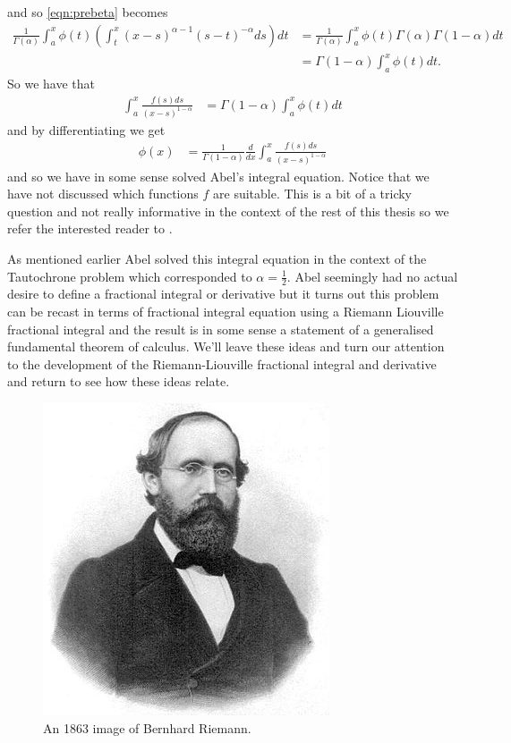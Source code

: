 and so \eqref{eqn:prebeta} becomes
\begin{align}
	\frac{1}{\Gamma(\alpha)} \int_a^x \phi(t) \left( \int_t^x (x-s)^{\alpha-1}(s-t)^{-\alpha} ds\right) dt
		&= \frac{1}{\Gamma(\alpha)} \int_a^x \phi(t) \Gamma(\alpha)\Gamma(1-\alpha) dt \\
		&= \Gamma(1-\alpha)\int_a^x \phi(t) dt. 
\end{align}
So we have that 
\begin{align}
	\int_a^x \frac{f(s)ds}{(x-s)^{1-\alpha}} &= \Gamma(1-\alpha)\int_a^x \phi(t) dt
\end{align}
and by differentiating we get
\begin{align}
	\phi(x) &= \frac{1}{\Gamma(1-\alpha)} \frac{d}{dx} \int_a^x \frac{f(s)ds}{(x-s)^{1-\alpha}}
\end{align}
and so we have in some sense solved Abel's integral equation. Notice that we have not discussed which functions $ f $ are suitable. This is a bit of a tricky question and not really informative in the context of the rest of this thesis so we refer the interested reader to \cite{Samko1993}. 

As mentioned earlier Abel solved this integral equation in the context of the Tautochrone problem which corresponded to $ \alpha = \frac{1}{2} $. Abel seemingly had no actual desire to define a fractional integral or derivative but it turns out this problem can be recast in terms of fractional integral equation using a Riemann Liouville fractional integral and the result is in some sense a statement of a generalised fundamental theorem of calculus. We'll leave these ideas and turn our attention to the development of the Riemann-Liouville fractional integral and derivative and return to see how these ideas relate.

\begin{figure}
    \includegraphics[scale=0.6]{images/Georg_Friedrich_Bernhard_Riemann}
    \caption{An 1863 image of Bernhard Riemann.}
\end{figure}


